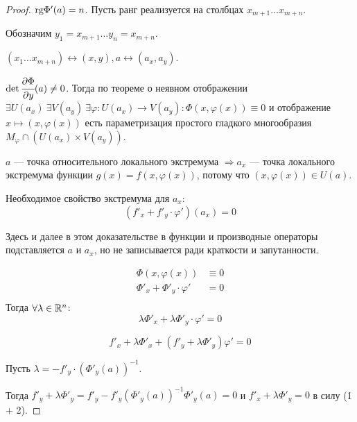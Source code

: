 \begin{proof}
    $\text{rg} \Phi'(a) = n$. Пусть ранг реализуется на столбцах $x_{m+1}\ldots x_{m+n}$.

    Обозначим $y_1 = x_{m+1} \ldots y_n = x_{m+n}$.

    $(x_1\ldots x_{m+n})\leftrightarrow (x, y), a \leftrightarrow (a_x, a_y)$.

    $\det \cfrac{\partial \Phi}{\partial y}(a) \not=0$. Тогда по теореме о неявном отображении $\exists U(a_x)\ \exists V(a_y)\ \exists \varphi : U(a_x) \to V(a_y) : \Phi(x, \varphi(x)) \equiv 0$ и отображение $x\mapsto (x, \varphi(x))$ есть параметризация простого гладкого многообразия $M_\varphi \cap (U(a_x) \times V(a_y))$.

    $a$ --- точка относительного локального экстремума $\Rightarrow a_x$ --- точка локального экстремума функции $g(x) = f(x, \varphi(x))$, потому что $(x, \varphi(x))\in U(a)$.

    Необходимое свойство экстремума для $a_x$:
    \begin{equation}
        (f'_x + f'_y \cdot \varphi')(a_x) = 0
    \end{equation}

    \begin{remark}
        Здесь и далее в этом доказательстве в функции и производные операторы подставляется $a$ и $a_x$, но не записывается ради краткости и запутанности.
    \end{remark}
    \begin{align*}
        \Phi(x, \varphi(x))              & \equiv 0 \\
        \Phi'_x + \Phi'_y \cdot \varphi' & = 0      \\
    \end{align*}
    Тогда $\forall \lambda \in\mathbb{R}^n$:
    \begin{equation}
        \lambda \Phi'_x + \lambda \Phi'_y \cdot \varphi' = 0
    \end{equation}

    \begin{equation}
        f'_x + \lambda \Phi'_x + (f'_y + \lambda \Phi'_y)\varphi' = 0 \tag{1 + 2}
    \end{equation}

    Пусть $\lambda = - f'_y \cdot (\Phi'_y(a))^{-1}$.

    Тогда $f'_y + \lambda \Phi'_y = f'_y - f'_y (\Phi'_y(a))^{-1}\Phi'_y(a) = 0$ и $f'_x + \lambda \Phi'_y = 0$ в силу (1 + 2).
\end{proof}

